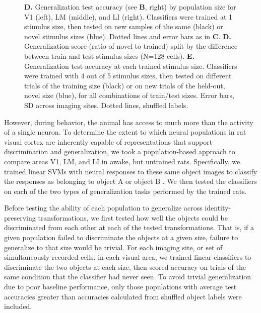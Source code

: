 \begin{figure}[t!]
{    \textbf{D.} Generalization test accuracy (see \textbf{B}, right) by population size for V1 (left), LM (middle), and LI (right). Classifiers were trained at 1 stimulus size, then tested on new samples of the same (black) or novel stimulus sizes (blue). Dotted lines and error bars as in \textbf{C}.
    \textbf{D.} Generalization score (ratio of novel to trained) split by the difference between train and test stimulus sizes (N=128 cells).
    \textbf{E.} Generalization test accuracy at each trained stimulus size. Classifiers were trained with 4 out of 5 stimulus sizes, then tested on different trials of the training size (black) or on new trials of the held-out, novel size (blue), for all combinations of train/test sizes. Error bars, SD across imaging sites. Dotted lines, shuffled labels.
    \label{fig:neural_generalization}}
\end{figure}


However, during behavior, the animal has access to much more than the activity of a single neuron. To determine the extent to which neural populations in rat visual cortex are inherently capable of representations that support discrimination and generalization, we took a population-based approach to compare areas V1, LM, and LI in awake, but untrained rats. Specifically, we trained linear SVMs with neural responses to these same object images to classify the responses as belonging to object A or object B \cite{Hung2005, Li2009, Rust2010SelectivityIT}. We then tested the classifiers on each of the two types of generalization tasks performed by the trained rats. 

Before testing the ability of each population to generalize across identity-preserving transformations, we first tested how well the objects could be discriminated from each other at each of the tested transformations. That is, if a given population failed to discriminate the objects at a given size, failure to generalize to that size would be trivial. For each imaging site, or set of simultaneously recorded cells, in each visual area, we trained linear classifiers to discriminate the two objects at each size, then scored accuracy on trials of the same condition that the classifier had never seen. To avoid trivial generalization due to poor baseline performance, only those populations with average test accuracies greater than accuracies calculated from shuffled object labels were included. 

